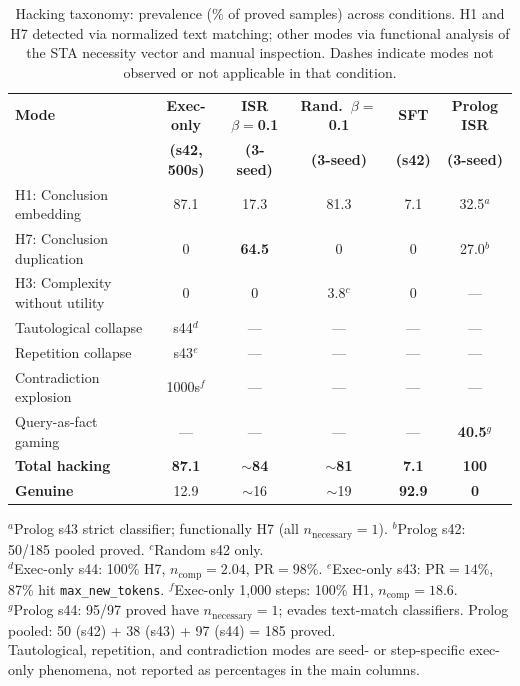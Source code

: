 \begin{table}[t]
\centering
\caption{Hacking taxonomy: prevalence (\% of proved samples) across conditions. H1 and H7 detected via normalized text matching; other modes via functional analysis of the STA necessity vector and manual inspection. Dashes indicate modes not observed or not applicable in that condition.}
\label{tab:taxonomy}
\small
\begin{tabular}{p{5.2cm}ccccc}
\toprule
\textbf{Mode} & \textbf{Exec-only} & \textbf{ISR $\beta{=}$0.1} & \textbf{Rand.\ $\beta{=}$0.1} & \textbf{SFT} & \textbf{Prolog ISR} \\
 & \textbf{(s42, 500s)} & \textbf{(3-seed)} & \textbf{(3-seed)} & \textbf{(s42)} & \textbf{(3-seed)} \\
\midrule
H1: Conclusion embedding & 87.1 & 17.3 & 81.3 & 7.1 & 32.5$^a$ \\
H7: Conclusion duplication & 0 & \textbf{64.5} & 0 & 0 & 27.0$^b$ \\
H3: Complexity without utility & 0 & 0 & 3.8$^c$ & 0 & --- \\
Tautological collapse & s44$^d$ & --- & --- & --- & --- \\
Repetition collapse & s43$^e$ & --- & --- & --- & --- \\
Contradiction explosion & 1000s$^f$ & --- & --- & --- & --- \\
Query-as-fact gaming & --- & --- & --- & --- & \textbf{40.5}$^g$ \\
\midrule
\textbf{Total hacking} & \textbf{87.1} & \textbf{$\sim$84} & \textbf{$\sim$81} & \textbf{7.1} & \textbf{100} \\
\textbf{Genuine} & 12.9 & $\sim$16 & $\sim$19 & \textbf{92.9} & \textbf{0} \\
\bottomrule
\end{tabular}

\vspace{2pt}
\begin{minipage}{\textwidth}
\footnotesize
$^a$Prolog s43 strict classifier; functionally H7 (all $n_{\text{necessary}}{=}1$). \quad
$^b$Prolog s42: 50/185 pooled proved. \quad
$^c$Random s42 only. \\
$^d$Exec-only s44: 100\% H7, $n_{\text{comp}}{=}2.04$, $\text{PR}{=}98\%$. \quad
$^e$Exec-only s43: $\text{PR}{=}14\%$, 87\% hit \texttt{max\_new\_tokens}. \quad
$^f$Exec-only 1{,}000 steps: 100\% H1, $n_{\text{comp}}{=}18.6$. \\
$^g$Prolog s44: 95/97 proved have $n_{\text{necessary}}{=}1$; evades text-match classifiers. \quad
Prolog pooled: 50 (s42) + 38 (s43) + 97 (s44) = 185 proved. \\
Tautological, repetition, and contradiction modes are seed- or step-specific exec-only phenomena, not reported as percentages in the main columns.
\end{minipage}
\end{table}

